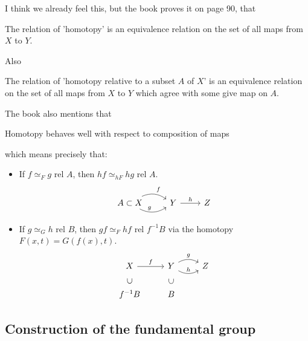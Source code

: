 I think we already feel this, but the book proves it on page 90, that

\begin{lemma}
    The relation of 'homotopy' is an equivalence relation on the set
    of all maps from $X$ to $Y$.
\end{lemma}

Also
\begin{lemma}
    The relation of 'homotopy relative to a subset $A$ of $X$' is an
    equivalence relation on the set of all maps from $X$ to $Y$ which
    agree with some give map on $A$.
\end{lemma}

The book also mentions that
\begin{lemma}
    Homotopy behaves well with respect to composition of maps
\end{lemma}
which means precisely that:
\begin{itemize}
    \item If $f\simeq_F g$ rel $A$, then $hf\simeq_{hF} hg$ rel $A$.
        $$ \begin{tikzcd}[]
            A\subset X \ar[r,"f",bend left]\ar[r,"g",bend right]
                & Y \ar[r,"h"] & Z
        \end{tikzcd}$$
    \item If $g\simeq_G h$ rel $B$, then $gf\simeq_F hf$ rel $f^{-1}B$
        via the homotopy $F(x,t)=G(f(x),t)$.
        $$ \begin{tikzcd}[]
            X\ar[r,"f"] & Y \ar[r,"g",bend left]\ar[r,"h",bend right]
             & Z \\
            f^{-1}B\ar[u,phantom,"\subset"
            {anchor=south,rotate=90,left=0,near end}]
                &
            B\ar[u,phantom,"\subset" {anchor=south,rotate=90,left=0,near
            end}] & \, 
        \end{tikzcd}$$
\end{itemize}

\subsection{Construction of the fundamental group}
\label{sec:Construction-of-the-fundamental-group}


